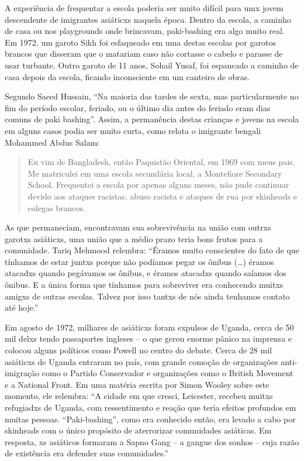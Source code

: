 A experiência de frequentar a escola poderia ser muito difícil para umx jovem descendente de imigrantes asiáticxs naquela época. Dentro da escola, a caminho de casa ou nos playgrounds onde brincavam, paki-bashing era algo muito real. Em 1972, um garoto Sikh foi esfaqueado em uma destas escolas por garotos brancos que disseram que o matariam caso não cortasse o cabelo e parasse de usar turbante. Outro garoto de 11 anos, Sohail Yusaf, foi espancado a caminho de casa depois da escola, ficando inconsciente em um canteiro de obras.

Segundo Saeed Hussain, “Na maioria das tardes de sexta, mas particularmente no fim do período escolar, feriado, ou o último dia antes do feriado eram dias comuns de paki bashing”. Assim, a permanência destas crianças e jovens na escola em alguns casos podia ser muito curta, como relata o imigrante bengali Mohammed Abdus Salam:

\begin{quote}
Eu vim de Bangladesh, então Paquistão Oriental, em 1969 com meus pais. Me matriculei em uma escola secundária local, a Montefiore Secondary School. Frequentei a escola por apenas alguns meses, não pude continuar devido aos ataques racistas, abuso racista e ataques de rua por skinheads e colegas brancos.
\end{quote}

As que permaneciam, encontravam sua sobrevivência na união com outrxs garotxs asiáticxs, uma união que a médio prazo teria bons frutos para a comunidade. Tariq Mehmood relembra: “Éramos muito conscientes do fato de que tínhamos de estar juntxs porque não podíamos pegar os ônibus (…) éramos atacadxs quando pegávamos os ônibus, e éramos atacadxs quando saíamos dos ônibus. E a única forma que tínhamos para sobreviver era conhecendo muitxs amigxs de outras escolas. Talvez por isso tantxs de nós ainda tenhamos contato até hoje.”

Em agosto de 1972, milhares de asiáticxs foram expulsos de Uganda, cerca de 50 mil delxs tendo passaportes ingleses – o que gerou enorme pânico na imprensa e colocou alguns políticos como Powell no centro do debate. Cerca de 28 mil asiáticxs de Uganda entraram no país, com grande comoção de organizações anti-imigração como o Partido Conservador e organizações como o British Movement e a National Front. Em uma matéria escrita por Simon Wooley sobre este momento, ele relembra: “A cidade em que cresci, Leicester, recebeu muitxs refugiadxs de Uganda, com ressentimento e reação que teria efeitos profundos em muitas pessoas. “Paki-bashing”, como era conhecido então, era levado a cabo por skinheads com o único propósito de aterrorizar comunidades asiáticas. Em resposta, xs asiáticos formaram a Sapno Gang – a gangue dos sonhos – cuja razão de existência era defender suas comunidades.”

